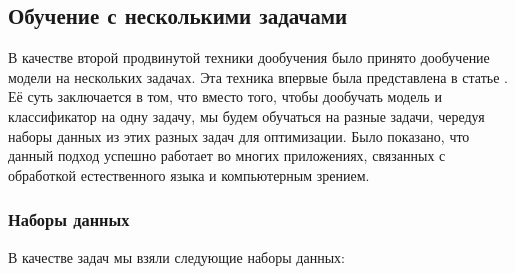 \documentclass[a4paper,14pt]{extarticle}
\begin{document}
    \subsection{Обучение с несколькими задачами}
    В качестве второй продвинутой техники дообучения было принято дообучение модели на нескольких задачах. Эта техника впервые была представлена в статье \cite{multi-task-learning}. Её суть заключается в том, что вместо того, чтобы дообучать модель и классификатор на одну задачу, мы будем обучаться на разные задачи, чередуя наборы данных из этих разных задач для оптимизации. Было показано, что данный подход успешно работает во многих приложениях, связанных с обработкой естественного языка и компьютерным зрением.
    
    \subsubsection{Наборы данных}
    В качестве задач мы взяли следующие наборы данных:
\end{document}
